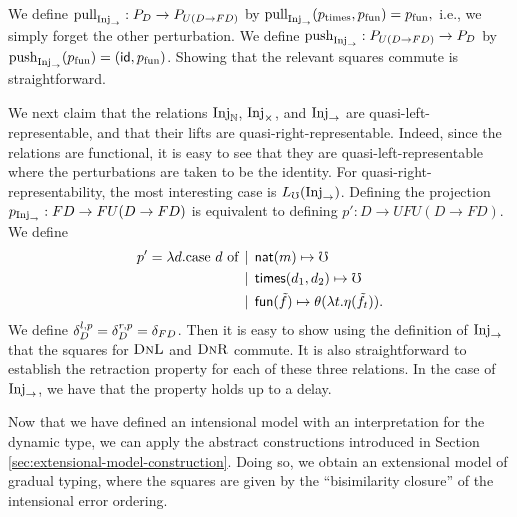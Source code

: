 We define $\text{pull}_{\text{Inj}_\to} : P_D \to P_{U(D \to FD)}$ by \( \text{pull}_{\text{Inj}_\to}(p_{\text{times}}, p_{\text{fun}}) = p_{\text{fun}}, \)
%
i.e., we simply forget the other perturbation.
%
We define $\text{push}_{\text{Inj}_\to} : P_{U(D \to FD)} \to P_D$ by \( \text{push}_{\text{Inj}_\to}(p_{\text{fun}}) = (\mathsf{id}, p_{\text{fun}}) \).
%
Showing that the relevant squares commute is straightforward.
%


We next claim that the relations $\text{Inj}_\mathbb{N}$, $\text{Inj}_\times$, and $\text{Inj}_\to$ are quasi-left-representable,
and that their lifts are quasi-right-representable.
Indeed, since the relations are functional, it is easy to see that they are quasi-left-representable
where the perturbations are taken to be the identity.
%
For quasi-right-representability, the most interesting case is $L_\mho(\text{Inj}_\to)$.
Defining the projection $p_{\text{Inj}_\to} : FD \to FU(D \to FD)$ is equivalent to defining
$p' : D \to UFU(D \to FD)$. We define
\begin{align*}
 p' = \lambda d.\text{case $d$ of}   &\mathrel{\bf \,\mid\,} \mathsf{nat}(m) \mapsto \mho \\
    &\mathrel{\bf \,\mid\,} \mathsf{times}(d_1, d_2) \mapsto \mho \\
    &\mathrel{\bf \,\mid\,} \mathsf{fun}(\tilde{f}) \mapsto \theta (\lambda t. \eta(\tilde{f}_t)).
\end{align*}
%
We define $\delta^{l,p}_D = \delta^{r,p}_D = \delta_{FD}$.
Then it is easy to show using the definition of $\text{Inj}_\to$ that the squares for $\textsc{DnL}$ and $\textsc{DnR}$ commute.
%
It is also straightforward to establish the retraction property for
each of these three relations. In the case of $\text{Inj}_\to$, we
have that the property holds up to a delay.


Now that we have defined an intensional model with an interpretation for the dynamic type, we can apply
the abstract constructions introduced in Section \ref{sec:extensional-model-construction}.
Doing so, we obtain an extensional model of gradual typing, where the squares are given by the
``bisimilarity closure'' of the intensional error ordering.


